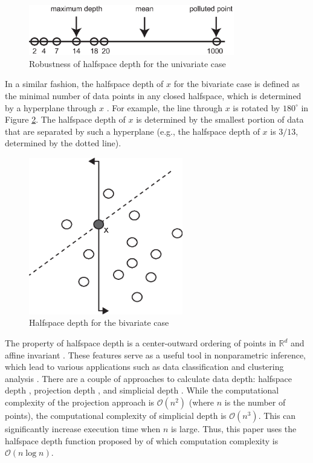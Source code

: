\documentclass[a4paper,UKenglish]{lipics-v2016}
\begin{document}
\begin{figure}
	\centering
	\includegraphics[width=0.8\textwidth]{images/depth_uni.eps}
	\caption{Robustness of halfspace depth for the univariate case}
	\label{fig:hd_uni}	
\end{figure}


In a similar fashion, the halfspace depth of $x$ for the bivariate case is defined as the minimal number of data points in any closed halfspace, which is determined by a hyperplane through $x$ \cite{rousseeuw96RSS}. For example, the line through $x$ is rotated by $180^{\circ}$ in Figure \ref{fig:hd_bi}. The halfspace depth of $x$ is determined by the smallest portion of data that are separated by such a hyperplane (e.g.,  the halfspace depth of $x$ is $3/13$, determined by the dotted line).
 
\begin{figure}
	\centering
	\includegraphics[width=0.6\textwidth]{images/depth_bi.eps}
	\caption{Halfspace depth for the bivariate case}
	\label{fig:hd_bi}	
\end{figure}

The property of halfspace depth is a center-outward ordering of points in  $\mathbb{R}^d$ and affine invariant \cite{Mosler13book}. These features serve as a useful tool in nonparametric inference, which lead to various applications such as data classification and clustering analysis
\cite{lange14fSP,jeong16acmgis}. There are a couple of approaches to calculate data depth: halfspace depth \cite{rousseeuw96RSS}, projection depth \cite{wilcox03CSSC}, and simplicial depth \cite{liu90AS}. While the computational complexity of the projection approach is $\mathcal{O}(n^2)$ (where $n$ is the number of points), the computational complexity of simplicial depth is $\mathcal{O}(n^3)$. This can significantly increase execution time when $n$ is large. Thus, this paper uses the halfspace depth function proposed by \cite{rousseeuw96RSS} of which computation complexity is $\mathcal{O}(n\log{}n)$.
\end{document}
